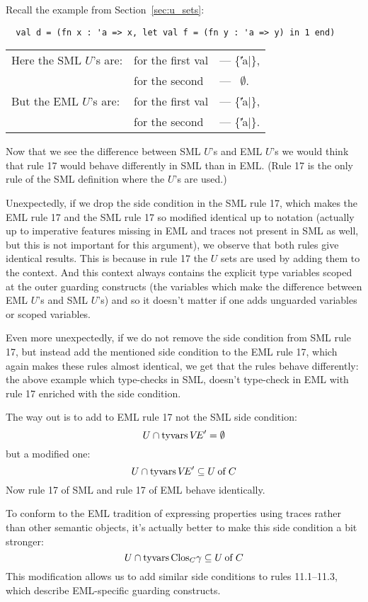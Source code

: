 Recall the example from Section~\ref{sec:u_sets}:

\begin{verbatim}
  val d = (fn x : 'a => x, let val f = (fn y : 'a => y) in 1 end)
\end{verbatim}

\noindent
\begin{tabular}[h]{lll}
Here the SML $U$'s are: & for the first val & ---  {\{\|'a|\}},\\
                        & for the second    & ---  ~$\emptyset$.\\ 
But the EML $U$'s are:  & for the first val & ---  {\{\|'a|\}},\\
                        & for the second    & ---  {\{\|'a|\}}.\\
\end{tabular}

Now that we see the difference between SML $U$'s and EML $U$'s
we would think that rule 17 would behave differently in SML than in EML. 
(Rule 17 is the only rule of the SML definition where the $U$'s are used.)

Unexpectedly, if we drop the side condition in the SML rule 17, 
which makes the EML rule 17 and the SML rule 17 so modified 
identical up to notation (actually up to imperative features
missing in EML and traces not present in SML as well, 
but this is not important for this argument), we observe
that both rules give identical results.
This is because in rule 17 the $U$ sets are used by adding them to the context.
And this context always contains the explicit type variables scoped 
at the outer guarding constructs (the variables which
make the difference between EML $U$'s and SML $U$'s) 
and so it doesn't matter if one adds unguarded variables or scoped variables. 

Even more unexpectedly, if we do not remove the side condition from
SML rule 17, but instead add the mentioned side condition to the EML rule 17,
which again makes these rules almost identical, we get that the rules behave 
differently: the above example which type-checks in SML, doesn't type-check
in EML with rule 17 enriched with the side condition.

The way out is to add to EML rule 17 not the SML side condition:
$$
U\cap\mathop{\rm tyvars}\nolimits\mbox{$V\!E$}'=\emptyset
$$
but a modified one:
$$
U\cap\mathop{\rm tyvars}\nolimits\mbox{$V\!E$}'\subseteq U \mathbin{\rm of} C
$$
Now rule 17 of SML and rule 17 of EML behave identically.

To conform to the EML tradition of expressing properties using traces 
rather than other semantic objects, it's actually 
better to make this side condition a bit stronger:
$$
U\cap\mathop{\rm tyvars}\nolimits{\rm Clos}_{C}\gamma\subseteq U \mathbin{\rm of} C
$$
This modification allows us to add similar side conditions
to rules 11.1--11.3, which describe EML-specific guarding constructs.

